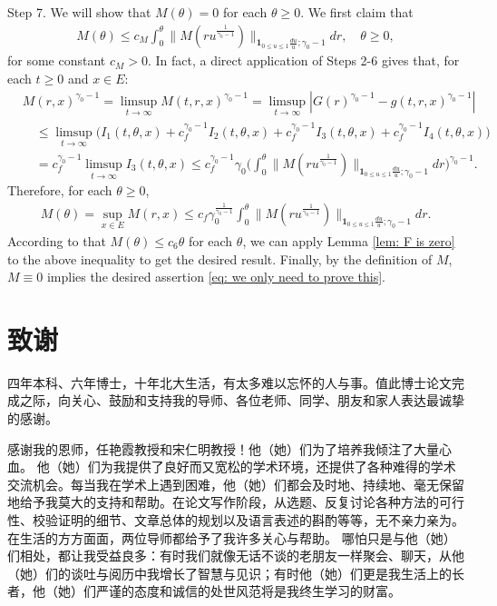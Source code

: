 \documentclass[UTF8]{pkuthss}
\theoremstyle{plain}
\theoremstyle{definition}
\numberwithin{equation}{section}
\begin{document}
	Step 7. We will show that $M(\theta) = 0$ for each $\theta \geq 0$.
	We first claim that
\begin{align}
	M(\theta)
	\leq c_M\int_0^\theta  \big\| M(r u^{\frac{1}{\gamma_0 - 1}}) \big\|_{\mathbf 1_{0\leq u\leq 1}\frac{du}{u};\gamma_0 - 1}  dr ,
	\quad \theta \geq 0,
\end{align}
	for some constant $c_M > 0$.
	In fact, a direct application of Steps 2-6 gives that, for each $t\geq 0$ and $x\in E$:
\begin{align}
	&M(r,x)^{\gamma_0 - 1}
	=\limsup_{t\to \infty} M(t,r,x)^{\gamma_0 - 1}
	= \limsup_{t\to \infty}|G(r)^{\gamma_0 - 1} - g(t,r,x)^{\gamma_0 - 1}|
	\\&\quad \leq \limsup_{t\to \infty} \big( I_1(t,\theta,x) +c^{\gamma_0 - 1}_f I_2(t,\theta,x) +c^{\gamma_0 - 1}_f I_3(t,\theta,x) + c^{\gamma_0 - 1}_f I_4(t,\theta,x) \big)
	\\& \quad = c_f^{\gamma_0 - 1} \limsup_{t\to \infty} I_3(t,\theta ,x)
	\leq c_f^{\gamma_0 - 1} \gamma_0 \Big(  \int_0^\theta  \big\| M(r u^{\frac{1}{\gamma_0 - 1}}) \big\|_{\mathbf 1_{0\leq u\leq 1}\frac{du}{u};\gamma_0 - 1}  dr\Big)^{\gamma_0 - 1}.
\end{align}
	Therefore, for each $\theta \geq 0$,
\begin{align}
	M(\theta)
	= \sup_{x\in E}  M(r,x)
	\leq c_f \gamma_0^{\frac{1}{\gamma_0 - 1}} \int_0^\theta  \big\| M(r u^{\frac{1}{\gamma_0 - 1}}) \big\|_{\mathbf 1_{0\leq u\leq 1}\frac{du}{u};\gamma_0 - 1}  dr.
\end{align}
	According to that $M(\theta) \leq c_6 \theta$ for each $\theta$, we can apply Lemma \ref{lem: F is zero} to the above inequality to get the desired result.
	Finally, by the definition of $M$,  $M\equiv 0$ implies the desired assertion \eqref{eq: we only need to prove this}.

\printbibliography[heading = bibintoc]
\backmatter
\chapter{致谢}	
	四年本科、六年博士，十年北大生活，有太多难以忘怀的人与事。值此博士论文完成之际，向关心、鼓励和支持我的导师、各位老师、同学、朋友和家人表达最诚挚的感谢。

	感谢我的恩师，任艳霞教授和宋仁明教授！他（她）们为了培养我倾注了大量心血。
	他（她）们为我提供了良好而又宽松的学术环境，还提供了各种难得的学术交流机会。每当我在学术上遇到困难，他（她）们都会及时地、持续地、毫无保留地给予我莫大的支持和帮助。在论文写作阶段，从选题、反复讨论各种方法的可行性、校验证明的细节、文章总体的规划以及语言表述的斟酌等等，无不亲力亲为。
	在生活的方方面面，两位导师都给予了我许多关心与帮助。
	哪怕只是与他（她）们相处，都让我受益良多：有时我们就像无话不谈的老朋友一样聚会、聊天，从他（她）们的谈吐与阅历中我增长了智慧与见识；有时他（她）们更是我生活上的长者，他（她）们严谨的态度和诚信的处世风范将是我终生学习的财富。
\end{document}
